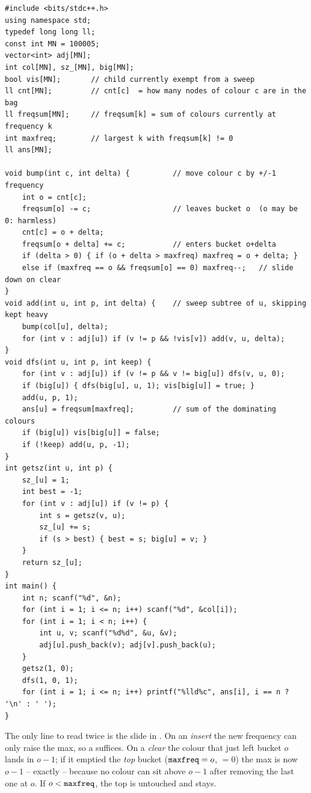 \begin{lstlisting}[caption={CF 600E full solution (sack + frequency buckets)}, label={lst:c28-600e-soln}]
#include <bits/stdc++.h>
using namespace std;
typedef long long ll;
const int MN = 100005;
vector<int> adj[MN];
int col[MN], sz_[MN], big[MN];
bool vis[MN];       // child currently exempt from a sweep
ll cnt[MN];         // cnt[c]  = how many nodes of colour c are in the bag
ll freqsum[MN];     // freqsum[k] = sum of colours currently at frequency k
int maxfreq;        // largest k with freqsum[k] != 0
ll ans[MN];

void bump(int c, int delta) {          // move colour c by +/-1 frequency
    int o = cnt[c];
    freqsum[o] -= c;                   // leaves bucket o  (o may be 0: harmless)
    cnt[c] = o + delta;
    freqsum[o + delta] += c;           // enters bucket o+delta
    if (delta > 0) { if (o + delta > maxfreq) maxfreq = o + delta; }
    else if (maxfreq == o && freqsum[o] == 0) maxfreq--;   // slide down on clear
}
void add(int u, int p, int delta) {    // sweep subtree of u, skipping kept heavy
    bump(col[u], delta);
    for (int v : adj[u]) if (v != p && !vis[v]) add(v, u, delta);
}
void dfs(int u, int p, int keep) {
    for (int v : adj[u]) if (v != p && v != big[u]) dfs(v, u, 0);
    if (big[u]) { dfs(big[u], u, 1); vis[big[u]] = true; }
    add(u, p, 1);
    ans[u] = freqsum[maxfreq];         // sum of the dominating colours
    if (big[u]) vis[big[u]] = false;
    if (!keep) add(u, p, -1);
}
int getsz(int u, int p) {
    sz_[u] = 1;
    int best = -1;
    for (int v : adj[u]) if (v != p) {
        int s = getsz(v, u);
        sz_[u] += s;
        if (s > best) { best = s; big[u] = v; }
    }
    return sz_[u];
}
int main() {
    int n; scanf("%d", &n);
    for (int i = 1; i <= n; i++) scanf("%d", &col[i]);
    for (int i = 1; i < n; i++) {
        int u, v; scanf("%d%d", &u, &v);
        adj[u].push_back(v); adj[v].push_back(u);
    }
    getsz(1, 0);
    dfs(1, 0, 1);
    for (int i = 1; i <= n; i++) printf("%lld%c", ans[i], i == n ? '\n' : ' ');
}
\end{lstlisting}

The only line to read twice is the  slide in .  On an
\emph{insert} the new frequency can only raise the max, so a  suffices.
On a \emph{clear} the colour that just left bucket \(o\) lands in \(o-1\); if it
emptied the \emph{top} bucket (\(\texttt{maxfreq}=o\), \(=0\)) the
max is now \(o-1\) -- exactly  -- because no colour can sit above
\(o-1\) after removing the last one at \(o\).  If \(o<\texttt{maxfreq}\), the top
is untouched and  stays.

